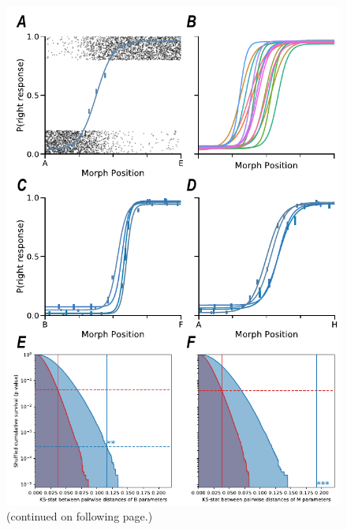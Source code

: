 \begin{figure}[tbp] 
  \centering
  \includegraphics[width=114mm]{figures/fig02_conserved.pdf}
  \caption[Psychometric curves are conserved among different birds]
{(continued on following page.)
}
  \label{fig:conserved}
\end{figure}

